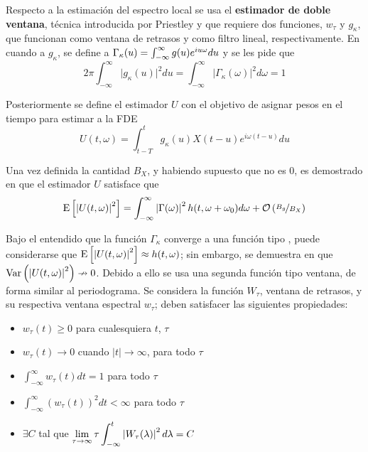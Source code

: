 Respecto a la estimación del espectro local se usa el \textbf{estimador de doble ventana}, 
técnica introducida por Priestley \cite{Priestley69} y que requiere dos funciones, $w_\tau$ y 
$g_\kappa$, que funcionan como ventana de retrasos y como filtro lineal, respectivamente.
%
En cuando a $g_\kappa$, se define a $\Gamma_\kappa(u) = \int_{-\infty}^{\infty} g(u) e^{i u \omega} du$ y se les pide que
\begin{equation*}
2\pi \int_{-\infty}^{\infty} \lvert g_\kappa(u) \lvert^{2} du 
= 
\int_{-\infty}^{\infty} \lvert \Gamma_\kappa(\omega) \lvert^{2} d\omega
= 1
\end{equation*}

Posteriormente se define el estimador $U$ con el objetivo de asignar pesos en el tiempo para estimar
a la FDE
\begin{equation*}
U(t,\omega) = \int_{t-T}^{t} g_\kappa(u) X({t-u}) e^{i \omega (t-u)} du
\end{equation*}

Una vez definida la cantidad $B_X$, y habiendo supuesto que no es 0, es demostrado en 
\cite{Priestley65} que el estimador $U$ satisface que
%
\begin{equation}
\mathrm{E}\left[ \left| U(t,\omega) \right|^{2} \right] = \int_{-\infty}^{\infty} \left| \Gamma(\omega) \right|^{2} h(t,\omega+\omega_0) d\omega
+ \mathcal{O}\left( \nicefrac{B_g}{B_X} \right)
\end{equation}

Bajo el entendido que la función $\Gamma_\kappa$ converge a una función tipo \dirac, puede 
considerarse que 
$\mathrm{E}\left[ \left| U(t,\omega) \right|^{2} \right] \approx h(t,\omega)$; sin embargo, se demuestra en \cite{Priestley66} 
que $\mathrm{Var}\left( \left| U(t,\omega) \right|^{2} \right) \nrightarrow 0$.
%
Debido a ello se usa una segunda función tipo ventana,
de forma similar al periodograma.
Se considera la función $W_\tau$, ventana de retrasos, y su respectiva ventana espectral 
$w_\tau$; deben satisfacer las siguientes propiedades:
\begin{itemize}
\item $w_{\tau}(t) \geq 0$ para cualesquiera $t$, $\tau$
\item $w_{\tau}(t) \rightarrow 0$ cuando $\lvert t \lvert \rightarrow \infty$, para todo $\tau$
\item $\displaystyle \int_{-\infty}^{\infty} w_{\tau}(t) dt = 1$ para todo $\tau$
\item $\displaystyle \int_{-\infty}^{\infty} \left( w_{\tau}(t) \right)^{2} dt < \infty$ para todo $\tau$
\item $\exists C$ tal que  
$\displaystyle \lim_{\tau\rightarrow\infty} \tau \int_{-\infty}^{t} \left|  W_{\tau}(\lambda)  \right|^{2} d\lambda = C$
\end{itemize}

